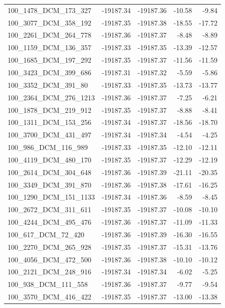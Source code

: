 \documentclass[journal=jacsat,manuscript=article]{achemso}
\begin{document}
\begin{table}[b!]
\begin{tabular}{lrrrr}
100\_1478\_DCM\_173\_327  & -19187.34 & -19187.36 &  -10.58 &  -9.84 \\
100\_3077\_DCM\_358\_192  & -19187.35 & -19187.38 &  -18.55 & -17.72 \\
100\_2261\_DCM\_264\_778  & -19187.36 & -19187.37 &   -8.48 &  -8.89 \\
100\_1159\_DCM\_136\_357  & -19187.33 & -19187.35 &  -13.39 & -12.57 \\
100\_1685\_DCM\_197\_292  & -19187.35 & -19187.37 &  -11.56 & -11.59 \\
100\_3423\_DCM\_399\_686  & -19187.31 & -19187.32 &   -5.59 &  -5.86 \\
100\_3352\_DCM\_391\_80   & -19187.33 & -19187.35 &  -13.73 & -13.77 \\
100\_2364\_DCM\_276\_1213 & -19187.36 & -19187.37 &   -7.25 &  -6.21 \\
100\_1878\_DCM\_219\_912  & -19187.35 & -19187.37 &   -8.88 &  -8.41 \\
100\_1311\_DCM\_153\_256  & -19187.34 & -19187.37 &  -18.56 & -18.70 \\
100\_3700\_DCM\_431\_497  & -19187.34 & -19187.34 &   -4.54 &  -4.25 \\
100\_986\_DCM\_116\_989   & -19187.33 & -19187.35 &  -12.10 & -12.11 \\
100\_4119\_DCM\_480\_170  & -19187.35 & -19187.37 &  -12.29 & -12.19 \\
100\_2614\_DCM\_304\_648  & -19187.36 & -19187.39 &  -21.11 & -20.35 \\
100\_3349\_DCM\_391\_870  & -19187.36 & -19187.38 &  -17.61 & -16.25 \\
100\_1290\_DCM\_151\_1133 & -19187.34 & -19187.36 &   -8.59 &  -8.45 \\
100\_2672\_DCM\_311\_611  & -19187.35 & -19187.37 &  -10.08 & -10.10 \\
100\_4244\_DCM\_495\_476  & -19187.36 & -19187.37 &  -11.09 & -11.33 \\
100\_617\_DCM\_72\_420    & -19187.36 & -19187.39 &  -16.30 & -16.55 \\
100\_2270\_DCM\_265\_928  & -19187.35 & -19187.37 &  -15.31 & -13.76 \\
100\_4056\_DCM\_472\_500  & -19187.36 & -19187.38 &  -10.10 & -10.12 \\
100\_2121\_DCM\_248\_916  & -19187.34 & -19187.34 &   -6.02 &  -5.25 \\
100\_938\_DCM\_111\_558   & -19187.36 & -19187.37 &   -9.77 &  -9.54 \\
100\_3570\_DCM\_416\_422  & -19187.35 & -19187.37 &  -13.00 & -13.38 \\

\end{tabular}
\end{table}
\end{document}
